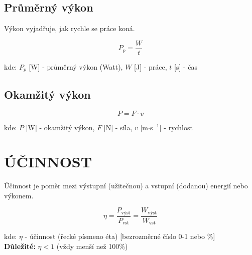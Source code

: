 \documentclass[a4paper,11pt]{article}
\begin{document}
\subsection{Průměrný výkon}

\begin{definitionbox}
Výkon vyjadřuje, jak rychle se práce koná.
\end{definitionbox}

\begin{equationbox}
\begin{equation*}
    P_p = \frac{W}{t}
\end{equation*}
\end{equationbox}

\begin{notebox}
kde: $P_p$ [W] - průměrný výkon (Watt), $W$ [J] - práce, $t$ [s] - čas
\end{notebox}

\subsection{Okamžitý výkon}

\begin{equationbox}
\begin{equation*}
    P = F \cdot v
\end{equation*}
\end{equationbox}

\begin{notebox}
kde: $P$ [W] - okamžitý výkon, $F$ [N] - síla, $v$ [m$\cdot$s$^{-1}$] - rychlost
\end{notebox}

\newpage

\section{ÚČINNOST}

\begin{definitionbox}
Účinnost je poměr mezi výstupní (užitečnou) a vstupní (dodanou) energií nebo výkonem.
\end{definitionbox}

\begin{equationbox}
\begin{equation*}
    \eta = \frac{P_{\text{výst}}}{P_{\text{vst}}} = \frac{W_{\text{výst}}}{W_{\text{vst}}}
\end{equation*}
\end{equationbox}

\begin{notebox}
kde: $\eta$ - účinnost (řecké písmeno éta) [bezrozměrné číslo 0-1 nebo \%]\\
\textbf{Důležité:} $\eta < 1$ (vždy menší než 100\%)
\end{notebox}
\end{document}
